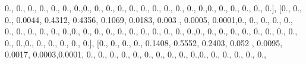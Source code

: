 \documentclass[
]{book}
\newenvironment{Shaded}{\begin{snugshade}}{\end{snugshade}}
\newcommand{\FloatTok}[1]{\textcolor[rgb]{0.00,0.00,0.81}{#1}}
\newcommand{\NormalTok}[1]{#1}
\begin{document}
\begin{Shaded}
\begin{Highlighting}[]
\FloatTok{0.}\NormalTok{, }\FloatTok{0.}\NormalTok{, }\FloatTok{0.}\NormalTok{, }\FloatTok{0.}\NormalTok{, }\FloatTok{0.}\NormalTok{, }\FloatTok{0.}\NormalTok{, }\FloatTok{0.}\NormalTok{,}\FloatTok{0.}\NormalTok{, }\FloatTok{0.}\NormalTok{, }\FloatTok{0.}\NormalTok{, }\FloatTok{0.}\NormalTok{, }\FloatTok{0.}\NormalTok{, }\FloatTok{0.}\NormalTok{, }\FloatTok{0.}\NormalTok{, }\FloatTok{0.}\NormalTok{, }\FloatTok{0.}\NormalTok{, }\FloatTok{0.}\NormalTok{, }\FloatTok{0.}\NormalTok{,}\FloatTok{0.}\NormalTok{, }\FloatTok{0.}\NormalTok{,}
\FloatTok{0.}\NormalTok{, }\FloatTok{0.}\NormalTok{, }\FloatTok{0.}\NormalTok{, }\FloatTok{0.}\NormalTok{], [}\FloatTok{0.}\NormalTok{, }\FloatTok{0.}\NormalTok{, }\FloatTok{0.}\NormalTok{, }\FloatTok{0.0044}\NormalTok{, }\FloatTok{0.4312}\NormalTok{, }\FloatTok{0.4356}\NormalTok{, }\FloatTok{0.1069}\NormalTok{, }\FloatTok{0.0183}\NormalTok{, }\FloatTok{0.003}\NormalTok{ ,}
\FloatTok{0.0005}\NormalTok{, }\FloatTok{0.0001}\NormalTok{,}\FloatTok{0.}\NormalTok{, }\FloatTok{0.}\NormalTok{, }\FloatTok{0.}\NormalTok{, }\FloatTok{0.}\NormalTok{, }\FloatTok{0.}\NormalTok{, }\FloatTok{0.}\NormalTok{, }\FloatTok{0.}\NormalTok{, }\FloatTok{0.}\NormalTok{, }\FloatTok{0.}\NormalTok{, }\FloatTok{0.}\NormalTok{, }\FloatTok{0.}\NormalTok{,}\FloatTok{0.}\NormalTok{, }\FloatTok{0.}\NormalTok{, }\FloatTok{0.}\NormalTok{, }\FloatTok{0.}\NormalTok{, }\FloatTok{0.}\NormalTok{,}
\FloatTok{0.}\NormalTok{, }\FloatTok{0.}\NormalTok{, }\FloatTok{0.}\NormalTok{, }\FloatTok{0.}\NormalTok{, }\FloatTok{0.}\NormalTok{, }\FloatTok{0.}\NormalTok{,}\FloatTok{0.}\NormalTok{, }\FloatTok{0.}\NormalTok{, }\FloatTok{0.}\NormalTok{, }\FloatTok{0.}\NormalTok{, }\FloatTok{0.}\NormalTok{, }\FloatTok{0.}\NormalTok{, }\FloatTok{0.}\NormalTok{, }\FloatTok{0.}\NormalTok{, }\FloatTok{0.}\NormalTok{, }\FloatTok{0.}\NormalTok{, }\FloatTok{0.}\NormalTok{,}\FloatTok{0.}\NormalTok{, }\FloatTok{0.}\NormalTok{, }\FloatTok{0.}\NormalTok{,}
\FloatTok{0.}\NormalTok{, }\FloatTok{0.}\NormalTok{, }\FloatTok{0.}\NormalTok{], [}\FloatTok{0.}\NormalTok{, }\FloatTok{0.}\NormalTok{, }\FloatTok{0.}\NormalTok{, }\FloatTok{0.}\NormalTok{, }\FloatTok{0.1408}\NormalTok{, }\FloatTok{0.5552}\NormalTok{, }\FloatTok{0.2403}\NormalTok{, }\FloatTok{0.052}\NormalTok{ , }\FloatTok{0.0095}\NormalTok{, }\FloatTok{0.0017}\NormalTok{,}
\FloatTok{0.0003}\NormalTok{,}\FloatTok{0.0001}\NormalTok{, }\FloatTok{0.}\NormalTok{, }\FloatTok{0.}\NormalTok{, }\FloatTok{0.}\NormalTok{, }\FloatTok{0.}\NormalTok{, }\FloatTok{0.}\NormalTok{, }\FloatTok{0.}\NormalTok{, }\FloatTok{0.}\NormalTok{, }\FloatTok{0.}\NormalTok{, }\FloatTok{0.}\NormalTok{, }\FloatTok{0.}\NormalTok{,}\FloatTok{0.}\NormalTok{, }\FloatTok{0.}\NormalTok{, }\FloatTok{0.}\NormalTok{, }\FloatTok{0.}\NormalTok{, }\FloatTok{0.}\NormalTok{, }\FloatTok{0.}\NormalTok{,}

\end{Highlighting}
\end{Shaded}
\end{document}
